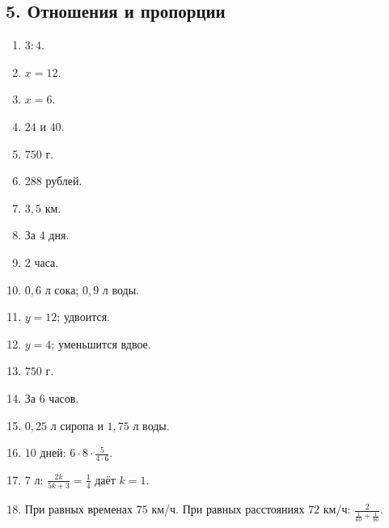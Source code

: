 \documentclass[12pt,a4paper]{article}
\theoremstyle{definition}
\theoremstyle{plain}
\theoremstyle{remark}
\newcommand{\starmark}{\ensuremath{{}^{\ast}}}
\begin{document}
\subsection*{5. Отношения и пропорции}
\begin{enumerate}[label=5.\arabic*.,leftmargin=2.8em,itemsep=5pt]
\item \(3 : 4\).
\item \(x = 12\).
\item \(x = 6\).
\item \(24\) и \(40\).
\item \(750\) г.
\item \(288\) рублей.
\item \(3,5\) км.
\item За \(4\) дня.
\item \(2\) часа.
\item \(0{,}6\) л сока; \(0{,}9\) л воды.
\item \(y = 12\); удвоится.
\item \(y = 4\); уменьшится вдвое.
\item \(750\) г.
\item За \(6\) часов.
\item \(0{,}25\) л сиропа и \(1{,}75\) л воды.
\item[\textbf{5.16.}\starmark] \(10\) дней: \(6 \cdot  8 \cdot  \frac{5}{4 \cdot  6}\).
\item[\textbf{5.17.}\starmark] \(7\) л: \(\frac{2 k}{5 k + 3} = \frac{1}{4}\) даёт \(k = 1\).
\item[\textbf{5.18.}\starmark] При равных временах \(75\) км/ч. При равных расстояниях \(72\) км/ч: \(\frac{2}{\frac{1}{60} + \frac{1}{90}}\).
\end{enumerate}
\end{document}

